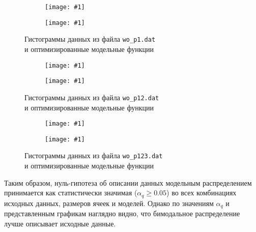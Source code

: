 \documentclass[a4paper, oneside]{article}
\newlength{\imagewidth}
\newlength{\imageheight}
\newcommand{\subgraphics}[1]{
\settowidth{\imagewidth}{\texttt{[image: \#1]}}%
\begin{subfigure}{\imagewidth}%
    \texttt{[image: \#1]}%
\end{subfigure}%
}
\begin{document}
\begin{figure}[H]
  \centering
  \setlength{\imageheight}{6.2cm}
  \subgraphics{wo_p1/histogram, 0.1}
  \subgraphics{wo_p1/histogram, 0.2}
  \caption{Гистограммы данных из файла \texttt{wo\_p1.dat} \\ и оптимизированные модельные функции}
\end{figure}

\newpage

\begin{figure}[H]
  \centering
  \setlength{\imageheight}{6.2cm}
  \subgraphics{wo_p12/histogram, 0.1}
  \subgraphics{wo_p12/histogram, 0.2}
  \caption{Гистограммы данных из файла \texttt{wo\_p12.dat} \\ и оптимизированные модельные функции}
\end{figure}

\begin{figure}[H]
  \centering
  \setlength{\imageheight}{6.2cm}
  \subgraphics{wo_p123/histogram, 0.1}
  \subgraphics{wo_p123/histogram, 0.2}
  \caption{Гистограммы данных из файла \texttt{wo\_p123.dat} \\ и оптимизированные модельные функции}
\end{figure}

Таким образом, нуль-гипотеза об описании данных модельным распределением принимается как статистически значимая ($ \alpha_q \geqslant 0.05 $) во всех комбинациях исходных данных, размеров ячеек и моделей. Однако по значениям $ \alpha_q $ и представленным графикам наглядно видно, что бимодальное распределение лучше описывает исходные данные.
\end{document}
